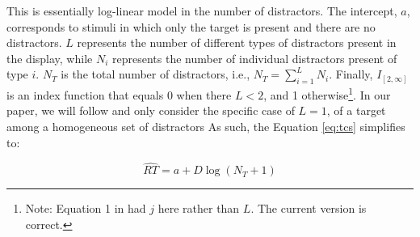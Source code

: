 \documentclass[preprint,12pt,authoryear]{elsarticle}
\begin{document}
This is essentially log-linear model in the number of distractors. The intercept, $a$, corresponds to stimuli in which only the target is present and there are no distractors. $L$ represents the number of different types of distractors present in the display, while $N_i$ represents the number of individual distractors present of type $i$. $N_T$ is the total number of distractors, i.e., $N_T = \sum_{i=1}^{L}N_i$. Finally, $I_{[2, \infty]}$ is an index function that equals 0 when there $L<2$, and 1 otherwise\footnote{Note: Equation 1 in \cite{lleras2020target} had $j$ here rather than $L$. The current version is correct.}. In our paper, we will follow \cite{buetti2019predicting} and only consider the specific case of $L=1$, of a target among a homogeneous set of distractors  As such, the Equation \ref{eq:tcs} simplifies to:

\begin{equation}
\hat{RT} = a + D\log(N_T+1)
\label{eq:loglin}
\end{equation}
\end{document}
